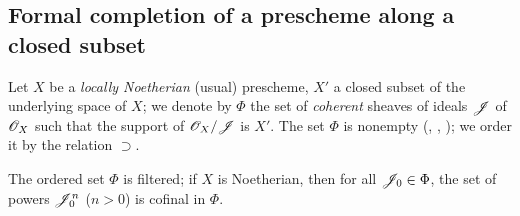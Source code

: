 \subsection{Formal completion of a prescheme along a closed subset}
\label{subsection-formal-completion-along-closed-subset}

\begin{env}[10.8.1]
\label{1.10.8.1}
Let $X$ be a \emph{locally Noetherian} (usual) prescheme, $X'$ a closed subset of the underlying space of $X$; we denote by $\Phi$ the set of \emph{coherent} sheaves of ideals $\mathscr{J}$ of $\mathscr{O}_X$ such that the support of $\mathscr{O}_X/\mathscr{J}$ is $X'$.
The set $\Phi$ is nonempty (, , ); we order it by the relation $\supset$.
\end{env}

\begin{lem}[10.8.2]
\label{1.10.8.2}
The ordered set $\Phi$ is filtered; if $X$ is Noetherian, then for all $\mathscr{J}_0\in\Phi$, the set of powers $\mathscr{J}_0^n$ ($n>0$) is cofinal in $\Phi$.
\end{lem}

